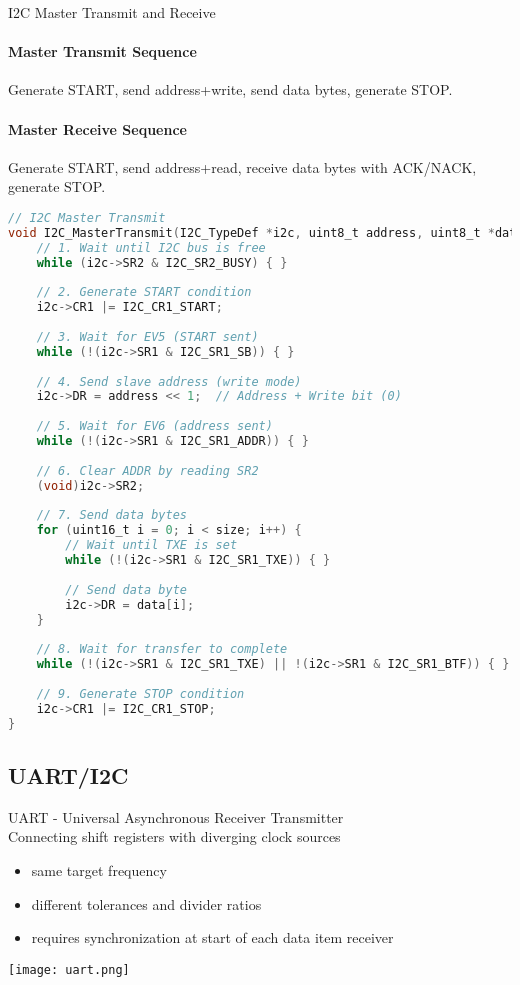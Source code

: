 \begin{KR}{I2C Master Transmit and Receive}
\paragraph{Master Transmit Sequence}
Generate START, send address+write, send data bytes, generate STOP.
\paragraph{Master Receive Sequence}
Generate START, send address+read, receive data bytes with ACK/NACK, generate STOP.

\begin{lstlisting}[language=C, style=basesmol]
// I2C Master Transmit
void I2C_MasterTransmit(I2C_TypeDef *i2c, uint8_t address, uint8_t *data, uint16_t size) {
    // 1. Wait until I2C bus is free
    while (i2c->SR2 & I2C_SR2_BUSY) { }
    
    // 2. Generate START condition
    i2c->CR1 |= I2C_CR1_START;
    
    // 3. Wait for EV5 (START sent)
    while (!(i2c->SR1 & I2C_SR1_SB)) { }
    
    // 4. Send slave address (write mode)
    i2c->DR = address << 1;  // Address + Write bit (0)
    
    // 5. Wait for EV6 (address sent)
    while (!(i2c->SR1 & I2C_SR1_ADDR)) { }
    
    // 6. Clear ADDR by reading SR2
    (void)i2c->SR2;
    
    // 7. Send data bytes
    for (uint16_t i = 0; i < size; i++) {
        // Wait until TXE is set
        while (!(i2c->SR1 & I2C_SR1_TXE)) { }
        
        // Send data byte
        i2c->DR = data[i];
    }
    
    // 8. Wait for transfer to complete
    while (!(i2c->SR1 & I2C_SR1_TXE) || !(i2c->SR1 & I2C_SR1_BTF)) { }
    
    // 9. Generate STOP condition
    i2c->CR1 |= I2C_CR1_STOP;
}
\end{lstlisting}
\end{KR}






\subsection{UART/I2C}

\begin{definition}{UART - Universal Asynchronous Receiver Transmitter}\\
    Connecting shift registers with diverging clock sources
    \begin{itemize}
        \item same target frequency
        \item different tolerances and divider ratios
        \item requires synchronization at start of each data item receiver
    \end{itemize}
    \texttt{[image: uart.png]}
\end{definition}

